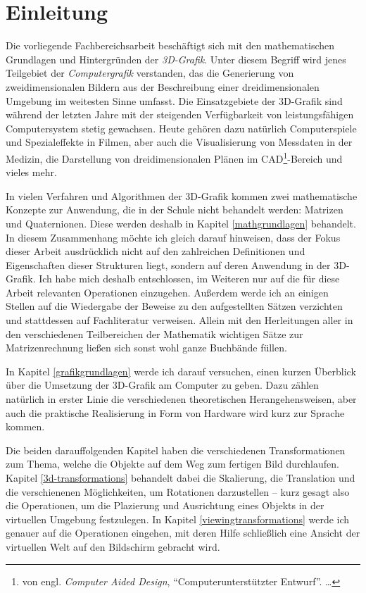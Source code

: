 \chapter{Einleitung}

Die vorliegende Fachbereichsarbeit beschäftigt sich mit den mathematischen Grundlagen und Hintergründen der \emph{3D-Grafik}. Unter diesem Begriff wird jenes Teilgebiet der \emph{Computergrafik} verstanden, das die Generierung von zweidimensionalen Bildern aus der Beschreibung einer dreidimensionalen Umgebung im weitesten Sinne umfasst. Die Einsatzgebiete der 3D-Grafik sind während der letzten Jahre mit der steigenden Verfügbarkeit von leistungsfähigen Computersystem stetig gewachsen. Heute gehören dazu natürlich Computerspiele und Spezialeffekte in Filmen, aber auch die Visualisierung von Messdaten in der Medizin, die Darstellung von dreidimensionalen Plänen im CAD\footnote{von engl. \emph{Computer Aided Design}, \enquote{Computerunterstützter Entwurf}. \ldots}-Bereich und vieles mehr.

In vielen Verfahren und Algorithmen der 3D-Grafik kommen zwei mathematische Konzepte zur Anwendung, die in der Schule nicht behandelt werden: Matrizen und Quaternionen. Diese werden deshalb in Kapitel \ref{mathgrundlagen} behandelt.
In diesem Zusammenhang möchte ich gleich darauf hinweisen, dass der Fokus dieser Arbeit ausdrücklich nicht auf den zahlreichen Definitionen und Eigenschaften dieser Strukturen liegt, sondern auf deren Anwendung in der 3D-Grafik.  Ich habe mich deshalb entschlossen, im Weiteren nur auf die für diese Arbeit relevanten Operationen einzugehen. Außerdem werde ich an einigen Stellen auf die Wiedergabe der Beweise zu den aufgestellten Sätzen verzichten und stattdessen auf Fachliteratur verweisen. Allein mit den Herleitungen aller in den verschiedenen Teilbereichen der Mathematik wichtigen Sätze zur Matrizenrechnung ließen sich sonst wohl ganze Buchbände füllen.

In Kapitel \ref{grafikgrundlagen} werde ich darauf versuchen, einen kurzen Überblick über die Umsetzung der 3D-Grafik am Computer zu geben. Dazu zählen natürlich in erster Linie die verschiedenen theoretischen Herangehensweisen, aber auch die praktische Realisierung in Form von Hardware wird kurz zur Sprache kommen.

Die beiden darauffolgenden Kapitel haben die verschiedenen Transformationen zum Thema, welche die Objekte auf dem Weg zum fertigen Bild durchlaufen. Kapitel \ref{3d-transformations} behandelt dabei die Skalierung, die Translation und die verschienenen Möglichkeiten, um Rotationen darzustellen -- kurz gesagt also die Operationen, um die Plazierung und Ausrichtung eines Objekts in der virtuellen Umgebung festzulegen. In Kapitel \ref{viewingtransformations} werde ich genauer auf die Operationen eingehen, mit deren Hilfe schließlich eine Ansicht der virtuellen Welt auf den Bildschirm gebracht wird.

